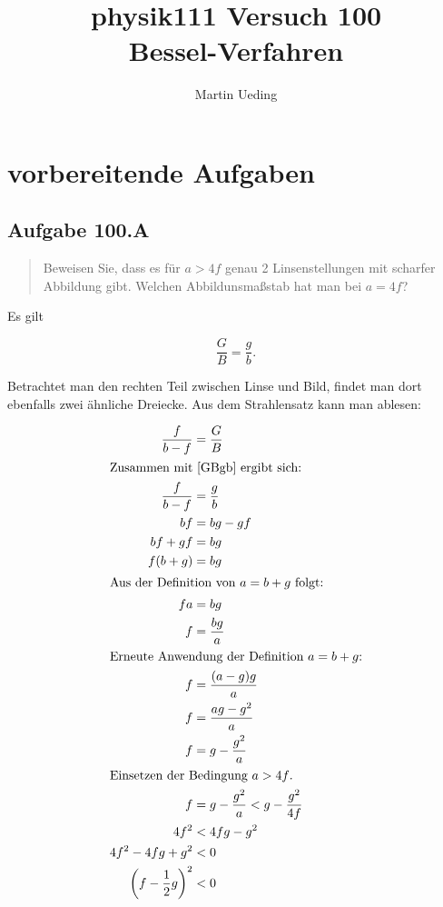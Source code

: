 \documentclass[11pt]{article}
\title{physik111 Versuch 100 \\ Bessel-Verfahren}
\author{Martin Ueding}
\newcommand{\half}{\frac{1}{2}}
\begin{document}
\maketitle

\section{vorbereitende Aufgaben}

\subsection{Aufgabe 100.A}

\begin{quote}
Beweisen Sie, dass es für $a > 4f$ genau 2 Linsenstellungen mit scharfer Abbildung gibt. Welchen Abbildunsmaßstab hat man bei $a = 4f$?
\end{quote}

Es gilt

\begin{equation}
\label{GBgb}
\frac{G}{B} = \frac{g}{b}.
\end{equation}

Betrachtet man den rechten Teil zwischen Linse und Bild, findet man dort ebenfalls zwei ähnliche Dreiecke. Aus dem Strahlensatz kann man ablesen:

\begin{align*}
\frac{f}{b-f} &= \frac{G}{B} \\
%
\intertext{Zusammen mit \eqref{GBgb} ergibt sich:}
%
\frac{f}{b-f} &= \frac{g}{b} \\
bf &= bg-gf \\
bf+gf &= bg \\
f(b+g) &= bg \\
%
\intertext{Aus der Definition von $a = b + g$ folgt:}
%
fa &= bg \\
f &= \frac{bg}{a} \\
%
\intertext{Erneute Anwendung der Definition $a = b + g$:}
%
f &= \frac{(a-g)g}{a} \\
f &= \frac{ag-g^2}{a} \\
f &= g - \frac{g^2}{a} \\
%
\intertext{Einsetzen der Bedingung $a > 4f$.}
%
f &= g - \frac{g^2}{a} < g - \frac{g^2}{4f} \\
4f^2 &< 4fg - g^2 \\
4f^2 - 4fg + g^2 &< 0 \\
\left(f-\half g \right)^2 &< 0 \\
\end{align*}
\end{document}
